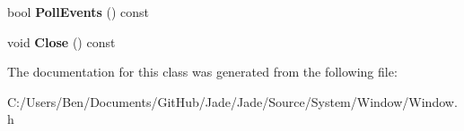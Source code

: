 \begin{DoxyCompactItemize}
\item 
\hypertarget{class_jade_1_1_system_1_1_window_a06eb435ef0e8dfed2b970e28363de3d7}{}bool {\bfseries Poll\+Events} () const \label{class_jade_1_1_system_1_1_window_a06eb435ef0e8dfed2b970e28363de3d7}

\item 
\hypertarget{class_jade_1_1_system_1_1_window_ac450a8a630467335661f4fd16a7f660e}{}void {\bfseries Close} () const \label{class_jade_1_1_system_1_1_window_ac450a8a630467335661f4fd16a7f660e}

\end{DoxyCompactItemize}


The documentation for this class was generated from the following file\+:\begin{DoxyCompactItemize}
\item 
C\+:/\+Users/\+Ben/\+Documents/\+Git\+Hub/\+Jade/\+Jade/\+Source/\+System/\+Window/Window.\+h\end{DoxyCompactItemize}
